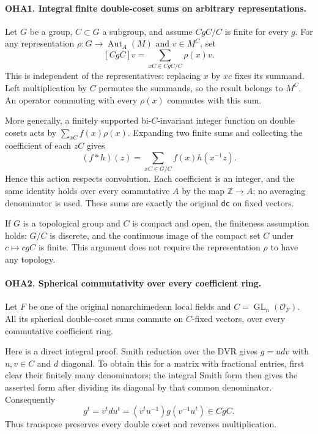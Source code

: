 \paragraph{OHA1. Integral finite double-coset sums on arbitrary representations.}
\label{claim:OHA1}
Let \(G\) be a group, \(C\subset G\) a subgroup, and assume
\(CgC/C\) is finite for every \(g\). For any representation
\(\rho:G\to\operatorname{Aut}_A(M)\) and \(v\in M^C\), set
\[
                 [CgC]v=\sum_{xC\in CgC/C}\rho(x)v .
\]
This is independent of the representatives: replacing \(x\)
by \(xc\) fixes its summand. Left multiplication by \(C\)
permutes the summands, so the result belongs to \(M^C\).
An operator commuting with every \(\rho(x)\) commutes with
this sum.

More generally, a finitely supported bi-\(C\)-invariant integer
function on double cosets acts by
\(\sum_{xC}f(x)\rho(x)\). Expanding two finite sums and collecting
the coefficient of each \(zC\) gives
\[
 (f*h)(z)=\sum_{xC\in G/C}f(x)h(x^{-1}z).
\]
Hence this action respects convolution. Each coefficient is an
integer, and the same identity holds over every commutative \(A\)
by the map \(\mathbb Z\to A\); no averaging denominator is used.
These sums are exactly the original \texttt{dc} on fixed vectors.

If \(G\) is a topological group and \(C\) is compact and open,
the finiteness assumption holds: \(G/C\) is discrete, and the
continuous image of the compact set \(C\) under \(c\mapsto cgC\)
is finite. This argument does not require the representation
\(\rho\) to have any topology.

\paragraph{OHA2. Spherical commutativity over every coefficient ring.}
\label{claim:OHA2}
Let \(F\) be one of the original nonarchimedean local fields and
\(C=\operatorname{GL}_n(\mathcal O_F)\). All its spherical
double-coset sums commute on \(C\)-fixed vectors, over every
commutative coefficient ring.

Here is a direct integral proof. Smith reduction over the DVR
gives \(g=u d v\) with \(u,v\in C\) and \(d\) diagonal. To obtain
this for a matrix with fractional entries, first clear their
finitely many denominators; the integral Smith form then gives
the asserted form after dividing its diagonal by that common
denominator. Consequently
\[
       g^t=v^t d u^t
          =(v^tu^{-1})g(v^{-1}u^t)\in CgC .
\]
Thus transpose preserves every double coset and reverses
multiplication.

